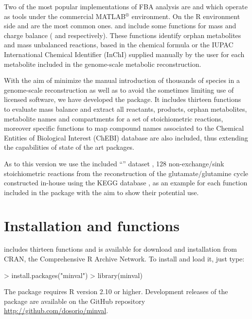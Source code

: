 Two of the most popular implementations of FBA analysis are  \citep{Becker2007} and  \citep{Agren2013} which operate as tools under the commercial MATLAB$^{\circledR}$ environment.  On the R environment side   and  are the most common ones.  and  include  some functions for mass and charge balance ( and  respectively). These functions identify orphan metabolites and mass unbalanced reactions, based in the chemical formula or the IUPAC International Chemical Identifier (InChI) supplied manually by the user for each metabolite included in the genome-scale metabolic reconstruction. 

With the aim of minimize the manual introduction of thousands of species in a genome-scale reconstruction as well as to avoid the sometimes limiting use of licensed software, we have developed the  package. It includes thirteen functions to evaluate mass balance and extract all reactants, products, orphan metabolites, metabolite names and compartments for a set of stoichiometric reactions, moreover specific functions to map compound names associated to the Chemical Entities of Biological Interest (ChEBI) database are also included, thus extending the capabilities of state of the art packages.

As to this version we use the included ``'' dataset \citep{NelsonE.2015}, 128 non-exchange/sink stoichiometric reactions from the reconstruction of the glutamate/glutamine cycle constructed in-house using the KEGG database , as an example for each function included in the  package with the aim to show their potential use.



\section{Installation and functions}
 includes thirteen functions and is available for download and installation from CRAN, the
Comprehensive R Archive Network. To install and load it, just type:
\begin{Schunk}
\begin{Sinput}
> install.packages("minval")
> library(minval)
\end{Sinput}
\end{Schunk}
The  package requires R version 2.10 or higher. Development releases of the package are available on the GitHub repository \url{http://github.com/dosorio/minval}.
